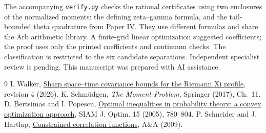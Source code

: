 \documentclass[11pt]{article}
\begin{document}
The accompanying \texttt{verify.py} checks the rational certificates using two enclosures of the normalized moments: the defining zeta--gamma formula, and the tail-bounded theta quadrature from Paper IV. They use different formulas and share the Arb arithmetic library. A finite-grid linear optimization suggested coefficients; the proof uses only the printed coefficients and continuum checks. The classification is restricted to the six candidate separations. Independent specialist review is pending. This manuscript was prepared with AI assistance.
\begin{thebibliography}{9}
 I. Walker, \href{https://github.com/iqwalker-debug/xi-positive-definiteness-/blob/61ea8576d6fa02f47a91e279faa4c4cbd0329772/paper-iv/Paper-IV.pdf}{Sharp space--time covariance bounds for the Riemann Xi profile}, revision 4 (2026).
 K. Schm\"udgen, \emph{The Moment Problem}, Springer (2017), Ch.~11.
 D. Bertsimas and I. Popescu, \href{https://doi.org/10.1137/S1052623401399903}{Optimal inequalities in probability theory: a convex optimization approach}, SIAM J. Optim. 15 (2005), 780--804.
 P. Schneider and J. Hartlap, \href{https://doi.org/10.1051/0004-6361/200912424}{Constrained correlation functions}, A\&A (2009).
\end{thebibliography}
\end{document}
